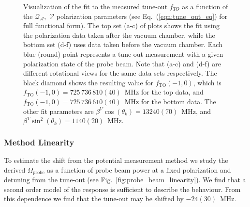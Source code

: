 \documentclass[%
 amsmath,amssymb,
aps,
]{revtex4-2}
\begin{document}
\newcommand{\subfigwidth}{0.28\linewidth}
\begin{figure}
    \centering
    \setlength{\FrameRule}{3pt}
    \setlength{\FrameSep}{0pt}
    \begin{framed}
    \hspace{0.5cm}%
    \hspace{0.5cm}%
  \end{framed}
  \vspace{-0.8cm}
    \begin{framed}
    \hspace{0.5cm}%
    \hspace{0.5cm}%
  \end{framed}
\caption{Visualization of the fit to the measured tune-out $f_{TO}$ as a function of the $\mathcal{Q_{A}}$,\, $\mathcal{V}$ polarization parameters (see Eq.~(\ref{eqn:tune_out_eq}) for full functional form). The top set (a-c) of plots shows the fit using the polarization data taken after the vacuum chamber, while the bottom set (d-f) uses data taken before the vacuum chamber.  Each blue (round) point represents a tune-out measurement with a given polarization state of the probe beam. Note that (a-c) and (d-f) are different rotational views for the same data sets respectively. The black diamond shows the resulting value for \(f_{\mathrm{TO}}(-1,0)\), which is \(f_{\mathrm{TO}}(-1,0)=725\, 736\, 810(40)\)~MHz for the top data, and \(f_{\mathrm{TO}}(-1,0)=725\, 736\, 610(40)\)~MHz for the bottom data. The other fit parameters are \(\beta^V \cos(\theta_k)=13240(70)\)~MHz, and \(\beta^T \sin^2(\theta_k)=1140(20)\)~MHz.}
\label{fig:full_tune_out}
\end{figure}

\subsubsection{Method Linearity}
To estimate the shift from the potential measurement method we study the derived \(\Omega_{\mathrm{probe}}\) as a function of probe beam power at a fixed polarization and detuning from the tune-out (see Fig.~\ref{fig:probe_beam_linearity}). We find that a second order model of the response is sufficient to describe the behaviour. From this dependence we find that the tune-out may be shifted by \(-24(30)\)~MHz.
\end{document}

